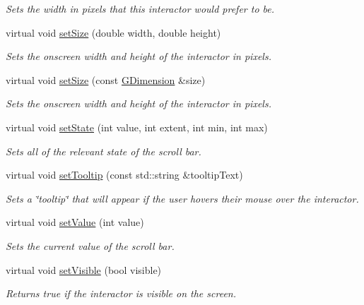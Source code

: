 \begin{DoxyCompactItemize}
\begin{DoxyCompactList}\small\item\em Sets the width in pixels that this interactor would prefer to be. \end{DoxyCompactList}\item 
virtual void \mbox{\hyperlink{classGInteractor_aca25d49481f9bf5fc8f7df4c086c4ce7}{set\+Size}} (double width, double height)
\begin{DoxyCompactList}\small\item\em Sets the onscreen width and height of the interactor in pixels. \end{DoxyCompactList}\item 
virtual void \mbox{\hyperlink{classGInteractor_ae2b628228f192c2702c4ce941b2af68f}{set\+Size}} (const \mbox{\hyperlink{structGDimension}{G\+Dimension}} \&size)
\begin{DoxyCompactList}\small\item\em Sets the onscreen width and height of the interactor in pixels. \end{DoxyCompactList}\item 
virtual void \mbox{\hyperlink{classGScrollBar_a83549f22abf65099f4c661a4601ade2b}{set\+State}} (int value, int extent, int min, int max)
\begin{DoxyCompactList}\small\item\em Sets all of the relevant state of the scroll bar. \end{DoxyCompactList}\item 
virtual void \mbox{\hyperlink{classGInteractor_a039e0e49beaecc275efce02d416acea8}{set\+Tooltip}} (const std\+::string \&tooltip\+Text)
\begin{DoxyCompactList}\small\item\em Sets a \char`\"{}tooltip\char`\"{} that will appear if the user hovers their mouse over the interactor. \end{DoxyCompactList}\item 
virtual void \mbox{\hyperlink{classGScrollBar_a23d79e21b8ed72e19278ca31d47b8c87}{set\+Value}} (int value)
\begin{DoxyCompactList}\small\item\em Sets the current value of the scroll bar. \end{DoxyCompactList}\item 
virtual void \mbox{\hyperlink{classGInteractor_a18e44e30b31525a243960ca3928125aa}{set\+Visible}} (bool visible)
\begin{DoxyCompactList}\small\item\em Returns true if the interactor is visible on the screen. \end{DoxyCompactList}\item 

\end{DoxyCompactItemize}
